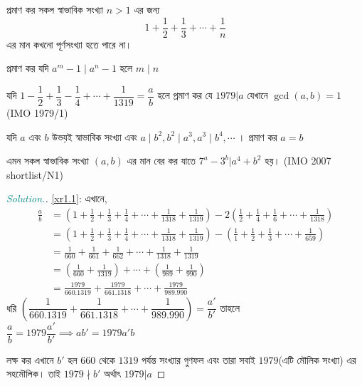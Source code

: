 \documentclass[a4paper,11pt]{article}
\newenvironment{sltn}{\begin{proof}[\emph{\textcolor{darkcyan}{Solution.}}]} {\end{proof}}
\begin{document}
\begin{Exercise}
\begin{prob}
	\end{prob}
	\begin{prob}
		প্রমাণ কর সকল স্বাভাবিক সংখ্যা $n>1$ এর জন্য
		\[1+\dfrac{1}{2}+\dfrac{1}{3}+\cdots+\dfrac{1}{n}\]
		এর মান কখনো পূর্ণসংখ্যা হতে পারে না। 
	\end{prob}
	\begin{prob}
		প্রমাণ কর যদি $a^m-1 \mid a^n-1$ হলে $m \mid n$
	\end{prob}
	\begin{prob}
		\label{xr1.1}
		যদি $1-\dfrac{1}{2}+\dfrac{1}{3}-\dfrac{1}{4}+\cdots+\dfrac{1}{1319}=\dfrac{a}{b}$ হলে প্রমাণ কর যে $1979|a$ যেখানে $\gcd(a,b)=1$(IMO 1979/1)
	\end{prob}
	\begin{prob}
		যদি $a$ এবং $b$ উভয়ই স্বাভাবিক সংখ্যা এবং $a \mid b^2, b^2 \mid a^3, a^3 \mid b^4, \cdots$ । প্রমাণ কর $a=b$
	\end{prob}
	\begin{prob}
		এমন সকল স্বাভাবিক সংখ্যা $(a,b)$ এর মান বের কর যাতে $7^a-3^b|a^4+b^2$ হয়। (IMO 2007 shortlist/N1)
	\end{prob}
	
	
	
\end{Exercise}
\begin{Answer}[ref={xr-1}]
	\begin{sltn}
		\ref{xr1.1}: এখানে, 
		\begin{align*}
			\frac{a}{b} & =\left(1+\frac{1}{2}+\frac{1}{3}+\frac{1}{4}+\cdots+\frac{1}{1318}+\frac{1}{1319}\right) - 2\left(\frac{1}{2}+\frac{1}{4}+\frac{1}{6}+\cdots+\frac{1}{1318}\right) \\
			            & = \left(1+\frac{1}{2}+\frac{1}{3}+\frac{1}{4}+\cdots+\frac{1}{1318}+\frac{1}{1319}\right) - \left(\frac{1}{1}+\frac{1}{2}+\frac{1}{3}+\cdots+\frac{1}{659}\right)  \\
			            & = \frac{1}{660}+\frac{1}{661}+\frac{1}{662}+\cdots+\frac{1}{1318}+\frac{1}{1319}                                                                                   \\
			            & = \left( \frac{1}{660} + \frac{1}{1319}\right) + \cdots + \left(\frac{1}{989} + \frac{1}{990}\right)                                                               \\
			            & = \frac {1979}{660.1319} + \frac {1979}{661.1318} + \cdots + \frac{1979}{989.990}
		\end{align*}
		ধরি $\left(\dfrac {1}{660.1319} + \dfrac {1}{661.1318} + \cdots + \dfrac{1}{989.990} \right)=\dfrac{a'}{b'}$ তাহলে $\dfrac{a}{b}=1979\dfrac{a'}{b'}\implies ab'=1979a'b$
		
		লক্ষ কর এখানে $b'$ হল $660$ থেকে $1319$ পর্যন্ত সংখ্যার গুণফল এবং তারা সবাই $1979$(এটি মৌলিক সংখ্যা) এর সহমৌলিক। তাই $1979 \nmid b'$ অর্থাৎ $1979|a$
	\end{sltn}
\end{Answer}
\newpage
\end{document}
